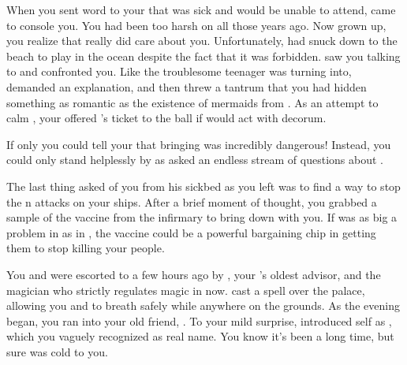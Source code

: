 \documentclass[char]{NeptuneBall}
\begin{document}
When you sent word to your \cKing{\parent} that \cEric{} was sick and would be unable to attend, \cKing{} came to console you. You had been too harsh on \cKing{\them} all those years ago. Now grown up, you realize that \cKing{} really did care about you. Unfortunately, \cWillow{} had snuck down to the beach to play in the ocean despite the fact that it was forbidden. \cWillow{\They} saw you talking to \cKing{} and confronted you. Like the troublesome teenager \cWillow{\they} was turning into, \cWillow{} demanded an explanation, and then threw a tantrum that you had hidden something as romantic as the existence of mermaids from \cWillow{\them}. As an attempt to calm \cWillow{}, your \cKing{\parent} offered \cWillow{\them} \cEric{}'s ticket to the ball if \cWillow{\they} would act with decorum.

If only you could tell your \cKing{\parent} that bringing \cWillow{} was incredibly dangerous! Instead, you could only stand helplessly by as \cWillow{} asked an endless stream of questions about \pAtlantis{}.

The last thing \cEric{} asked of you from his sickbed as you left was to find a way to stop the \pPacifica{}n attacks on your ships. After a brief moment of thought, you grabbed a sample of the \cPolio{} vaccine from the infirmary to bring down with you. If \cPolio{} was as big a problem in \pPacifica{} as in \pAtlantis{}, the \cPolio{} vaccine could be a powerful bargaining chip in getting them to stop killing your people. 

You and \cWillow{} were escorted to \pAtlantis{} a few hours ago by \cManta{}, your \cKing{\parent}'s oldest advisor, and the magician who strictly regulates magic in \pAtlantis{} now. \cManta{} cast a spell over the palace, allowing you and \cWillow{} to breath safely while anywhere on the grounds. As the evening began, you ran into your old friend, \cPriest{}. To your mild surprise, \cPriest{\they} introduced \cPriest{\them}self as \cPriest{\MYname}, which you vaguely recognized as \cPriest{\their} real name. You know it's been a long time, but \cPriest{} sure was cold to you.
\end{document}
